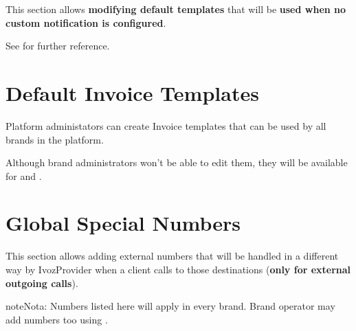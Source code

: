 \documentclass[letterpaper,10pt,spanish]{sphinxmanual}
\begin{document}
This section allows \textbf{modifying default templates} that will be \textbf{used when no custom notification is configured}.

See {\hyperref[administration_portal/brand/settings/notification_templates:notification\string-templates]{}} for further reference.


\section{Default Invoice Templates}
\label{administration_portal/platform/default_invoice_templates::doc}\label{administration_portal/platform/default_invoice_templates:default-invoice-templates}\label{administration_portal/platform/default_invoice_templates:id1}
Platform administators can create Invoice templates that can be used by all brands in the platform.

Although brand administrators won't be able to edit them, they will be available for {\hyperref[administration_portal/brand/invoicing/invoices:invoices]{}}
and {\hyperref[administration_portal/brand/invoicing/invoice_schedulers:invoice\string-schedulers]{}}.


\section{Global Special Numbers}
\label{administration_portal/platform/global_special_numbers:global-special-numbers}\label{administration_portal/platform/global_special_numbers::doc}
This section allows adding external numbers that will be handled in a different way by IvozProvider when a client
calls to those destinations (\textbf{only for external outgoing calls}).

\begin{notice}{note}{Nota:}
Numbers listed here will apply in every brand. Brand operator may add numbers too using {\hyperref[administration_portal/brand/settings/special_numbers:special\string-numbers]{}}.
\end{notice}
\end{document}
